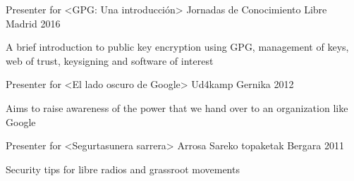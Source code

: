 

\begin{cventries}

  \cventry
    {Presenter for <GPG: Una introducción>} %
    {Jornadas de Conocimiento Libre} %
    {Madrid} %
    {2016} %
    {
      \begin{cvitems} %
        \item {A brief introduction to public key encryption using GPG,
            management of keys, web of trust, keysigning and software of
            interest}
      \end{cvitems}
    }

  \cventry
    {Presenter for <El lado oscuro de Google>} %
    {Ud4kamp} %
    {Gernika} %
    {2012} %
    {
      \begin{cvitems} %
        \item {Aims to raise awareness of the power that we hand over to an
            organization like Google}
      \end{cvitems}
    }

  \cventry
    {Presenter for <Segurtasunera sarrera>} %
    {Arrosa Sareko topaketak} %
    {Bergara} %
    {2011} %
    {
      \begin{cvitems} %
        \item {Security tips for libre radios and grassroot movements}
      \end{cvitems}
    }

\end{cventries}
